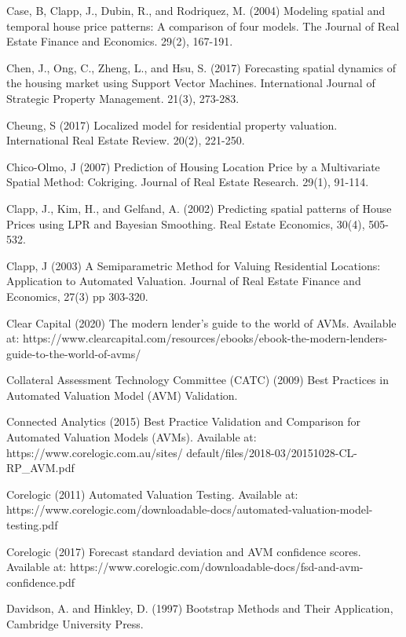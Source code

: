 \documentclass[colTwo]{anon}
\theoremstyle{definition}
\begin{document}
\begin{thebibliography}{50}
\harvarditem{}{}{}Case, B, Clapp, J., Dubin, R., and Rodriquez, M. (2004) Modeling spatial and temporal house price patterns: A comparison of four models. The Journal of Real Estate Finance and Economics. 29(2), 167-191. 

\harvarditem{}{}{}Chen, J., Ong, C., Zheng, L., and Hsu, S. (2017) Forecasting spatial dynamics of the housing market using Support Vector Machines. International Journal of Strategic Property Management. 21(3), 273-283. 

\harvarditem{}{}{}Cheung, S (2017) Localized model for residential property valuation. International Real Estate Review. 20(2), 221-250. 

\harvarditem{}{}{}Chico-Olmo, J (2007) Prediction of Housing Location Price by a Multivariate Spatial Method: Cokriging. Journal of Real Estate Research. 29(1), 91-114. 

\harvarditem{}{}{}Clapp, J., Kim, H., and Gelfand, A. (2002) Predicting spatial patterns of House Prices using LPR and Bayesian Smoothing. Real Estate Economics, 30(4), 505-532. 

\harvarditem{}{}{}Clapp, J (2003) A Semiparametric Method for Valuing Residential Locations: Application to Automated Valuation. Journal of Real Estate Finance and Economics, 27(3) pp 303-320. 

\harvarditem{}{}{}Clear Capital (2020) The modern lender’s guide to the world of AVMs. Available at: https://www.clearcapital.com/resources/ebooks/ebook-the-modern-lenders-guide-to-the-world-of-avms/

\harvarditem{}{}{}Collateral Assessment Technology Committee (CATC) (2009) Best Practices in Automated Valuation Model (AVM) Validation. 

\harvarditem{}{}{}Connected Analytics (2015) Best Practice Validation and Comparison for Automated Valuation Models (AVMs). Available at: https://www.corelogic.com.au/sites/ default/files/2018-03/20151028-CL-RP\_AVM.pdf

\harvarditem{}{}{}Corelogic (2011) Automated Valuation Testing. Available at: https://www.corelogic.com/downloadable-docs/automated-valuation-model-testing.pdf
		
\harvarditem{}{}{}Corelogic (2017) Forecast standard deviation and AVM confidence scores. Available at: https://www.corelogic.com/downloadable-docs/fsd-and-avm-confidence.pdf

\harvarditem{}{}{}Davidson, A. and Hinkley, D. (1997) Bootstrap Methods and Their Application, Cambridge University Press.  


\end{thebibliography}
\end{document}
